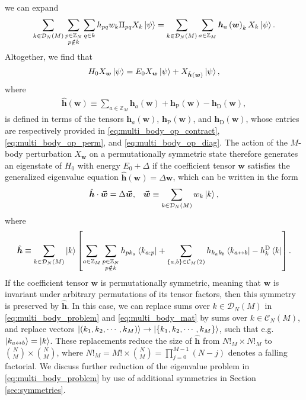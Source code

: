 \documentclass[nofootinbib,notitlepage,11pt]{revtex4-2}
\renewcommand{\t}{\text} %
\newcommand{\p}[1]{\left(#1\right)} %
\renewcommand{\sp}[1]{\left[#1\right]} %
\renewcommand{\set}[1]{\left\{#1\right\}} %
\renewcommand{\c}{\cdot} %
\newcommand{\m}{\bm} %
\renewcommand{\v}{\vec} %
\newcommand{\1}{\mathds{1}}
\newcommand{\C}{\mathcal{C}}
\newcommand{\D}{\mathcal{D}}
\newcommand{\ZZ}{\mathbb{Z}}
\newcommand{\lra}{\leftrightarrow}
\begin{document}
we can expand
\begin{align}
  \sum_{k\in\D_N\p{M}} \sum_{\substack{p\in\ZZ_N\\p\notin k}}
  \sum_{q\in k} h_{pq} w_k  \Pi_{pq} X_k \ket\psi
  = \sum_{k\in\D_N\p{M}} \sum_{a\in\ZZ_M}
  \m h_a\p{\m w}_k X_k \ket\psi.
\end{align}
Altogether, we find that
\begin{align}
  H_0 X_{\m w} \ket\psi
  = E_0 X_{\m w} \ket\psi + X_{\hat{\m h}\p{\m w}} \ket\psi,
\end{align}
where
\begin{align}
  \hat{\m h}\p{\m w}
  \equiv \sum_{a\in\ZZ_M} \m h_a\p{\m w}
  + \m h_{\t{P}}\p{\m w} - \m h_{\t{D}}\p{\m w},
\end{align}
is defined in terms of the tensors $\m h_a\p{\m w}$,
$\m h_{\t{P}}\p{\m w}$, and $\m h_{\t{D}}\p{\m w}$, whose entries are
respectively provided in \eqref{eq:multi_body_op_contract},
\eqref{eq:multi_body_op_perm}, and \eqref{eq:multi_body_op_diag}.  The
action of the $M$-body perturbation $X_{\m w}$ on a permutationally
symmetric state therefore generates an eigenstate of $H_0$ with energy
$E_0+\Delta$ if the coefficient tensor $\m w$ satisfies the
generalized eigenvalue equation $\hat{\m h}\p{\m w} = \Delta \m w$,
which can be written in the form
\begin{align}
  \hat{\m h} \c \v{\m w} = \Delta \v{\m w},
  &&
  \v{\m w} \equiv \sum_{k\in\D_N\p{M}} w_k \ket{k},
  \label{eq:multi_body_problem}
\end{align}
where
\begin{align}
  \hat{\m h} \equiv \sum_{k\in\D_N\p{M}} \ket{k}
  \sp{\sum_{a\in\ZZ_M} \sum_{\substack{p\in\ZZ_N\\p\notin k}}
    h_{pk_a} \bra{k_{a:p}}
    + \sum_{\set{a,b}\in\C_M\p{2}} h_{k_ak_b} \bra{k_{a\lra b}}
    - h^{\t{D}}_k \bra{k}}.
  \label{eq:multi_body_mat}
\end{align}
If the coefficient tensor $\m w$ is permutationally symmetric, meaning
that $\m w$ is invariant under arbitrary permutations of its tensor
factors, then this symmetry is preserved by $\hat{\m h}$.  In this
case, we can replace sums over $k\in\D_N\p{M}$ in
\eqref{eq:multi_body_problem} and \eqref{eq:multi_body_mat} by sums
over $k\in\C_N\p{M}$, and replace vectors
$\ket{\p{k_1,k_2,\cdots,k_M}}\to\ket{\set{k_1,k_2,\cdots,k_M}}$, such
that e.g.~$\ket{k_{a\lra b}}=\ket{k}$.  These replacements reduce the
size of $\hat{\m h}$ from $N!_M\times N!_M$ to
${N\choose M}\times{N\choose M}$, where
$N!_M=M!\times{N\choose M}=\prod_{j=0}^{M-1}\p{N-j}$ denotes a falling
factorial.  We discuss further reduction of the eigenvalue problem in
\eqref{eq:multi_body_problem} by use of additional symmetries in
Section \ref{sec:symmetries}.
\end{document}
